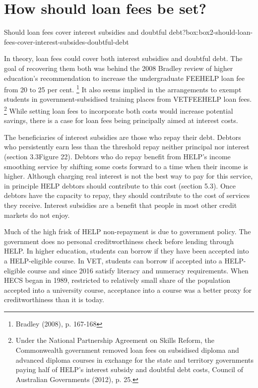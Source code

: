 \documentclass[embargoed]{grattan}
\begin{document}
\section{How should loan fees be set?}\label{how-should-loan-fees-be-set}


\begin{bigbox*}{Should loan fees cover interest subsidies and doubtful debt?}{box:box2-should-loan-fees-cover-interest-subsides-doubtful-debt}

In theory, loan fees could cover both interest subsidies and doubtful debt.
The goal of recovering them both was behind the 2008 Bradley review of higher education's recommendation to increase the undergraduate \gls{FEEHELP} loan fee from 20 to 25 per cent.%
\footnote{Bradley (2008), p. 167-168} It also seems implied in the arrangements to exempt students in government-subsidised training places from \gls{VETFEEHELP} loan fees.%
\footnote{Under the National Partnership Agreement on Skills Reform, the Commonwealth government removed loan fees on subsidised diploma and advanced diploma courses in exchange for the state and territory governments paying half of \gls{HELP}'s interest subsidy and doubtful debt costs, Council of Australian Governments (2012), p. 25.} While setting loan fees to incorporate both costs would increase potential savings, there is a case for loan fees being principally aimed at interest costs.

The beneficiaries of interest subsidies are those who repay their debt.
Debtors who persistently earn less than the threshold repay neither principal nor interest (section 3.3Figure 22).
Debtors who do repay benefit from \gls{HELP}'s income smoothing service by shifting some costs forward to a time when their income is higher.
Although charging real interest is not the best way to pay for this service, in principle \gls{HELP} debtors should contribute to this cost (section 5.3).
Once debtors have the capacity to repay, they should contribute to the cost of services they receive.
Interest subsidies are a benefit that people in most other credit markets do not enjoy.

Much of the high frisk of \gls{HELP} non-repayment is due to government policy.
The government does no personal creditworthiness check before lending through \gls{HELP}.
In higher education, students can borrow if they have been accepted into a \gls{HELP}-eligible course.
In VET, students can borrow if accepted into a \gls{HELP}-eligible course and since 2016 satisfy literacy and numeracy requirements.
When \gls{HECS} began in 1989, restricted to relatively small share of the population accepted into a university course, acceptance into a course was a better proxy for creditworthiness than it is today.


\end{bigbox*}
\end{document}
